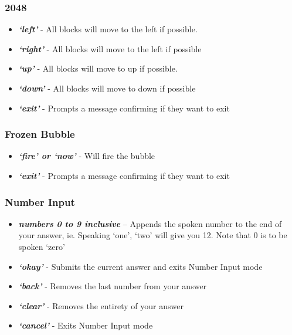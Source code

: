 \documentclass[11pt, oneside]{article}
\begin{document}
\subsubsection{2048}

\begin{itemize}
	\item {\em\bf`left'} - All blocks will move to the left if possible. 
	\item {\em\bf`right'} - All blocks will move to the left if possible
	\item {\em\bf`up'} - All blocks will move to up if possible. 
	\item {\em\bf`down'} - All blocks will move to down if possible
	\item {\em\bf`exit'} - Prompts a message confirming if they want to exit
	
\end{itemize}

\subsubsection{Frozen Bubble}

\begin{itemize}
	\item {\em\bf`fire' or `now'} - Will fire the bubble
	\item {\em\bf`exit'} - Prompts a message confirming if they want to exit
	
\end{itemize}

\pagebreak

\subsubsection{Number Input}
\begin{itemize}
  \item {\em\bf numbers 0 to 9 inclusive} – Appends the spoken number
    to the end of your answer, ie. Speaking `one', `two' will give you
    12. Note that 0 is to be spoken `zero'
  \item {\em\bf `okay'} - Submits the current answer and exits Number
    Input mode
  \item {\em\bf `back'} - Removes the last number from your answer
  \item {\em\bf `clear'} - Removes the entirety of your answer
  \item {\em\bf `cancel'} - Exits Number Input mode
\end{itemize}
\end{document}
